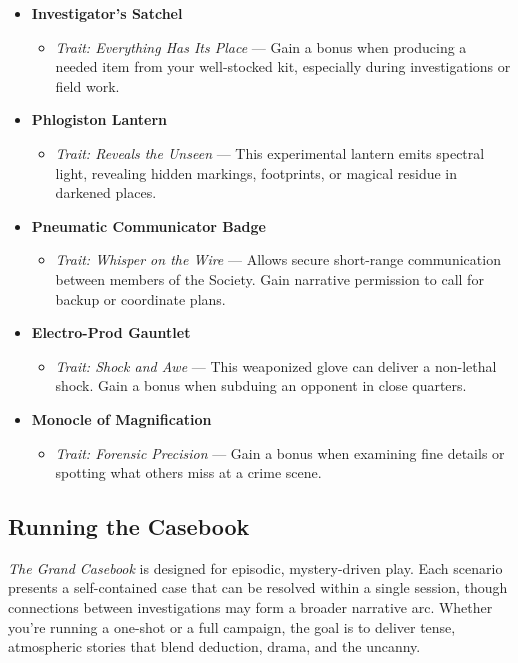 \begin{itemize}\raggedright
  \item \textbf{Investigator’s Satchel}  
  \begin{itemize}
    \item \emph{Trait: Everything Has Its Place} — Gain a bonus when producing a needed item from your well-stocked kit, especially during investigations or field work.
  \end{itemize}
  
  \item \textbf{Phlogiston Lantern}  
  \begin{itemize}
    \item \emph{Trait: Reveals the Unseen} — This experimental lantern emits spectral light, revealing hidden markings, footprints, or magical residue in darkened places.
  \end{itemize}

  \item \textbf{Pneumatic Communicator Badge}  
  \begin{itemize}
    \item \emph{Trait: Whisper on the Wire} — Allows secure short-range communication between members of the Society. Gain narrative permission to call for backup or coordinate plans.
  \end{itemize}

  \item \textbf{Electro-Prod Gauntlet}  
  \begin{itemize}
    \item \emph{Trait: Shock and Awe} — This weaponized glove can deliver a non-lethal shock. Gain a bonus when subduing an opponent in close quarters.
  \end{itemize}

  \item \textbf{Monocle of Magnification}  
  \begin{itemize}
    \item \emph{Trait: Forensic Precision} — Gain a bonus when examining fine details or spotting what others miss at a crime scene.
  \end{itemize}
\end{itemize}



\subsection{Running the Casebook}

\noindent
\textit{The Grand Casebook} is designed for episodic, mystery-driven play. Each scenario presents a self-contained case that can be resolved within a single session, though connections between investigations may form a broader narrative arc. Whether you're running a one-shot or a full campaign, the goal is to deliver tense, atmospheric stories that blend deduction, drama, and the uncanny.

